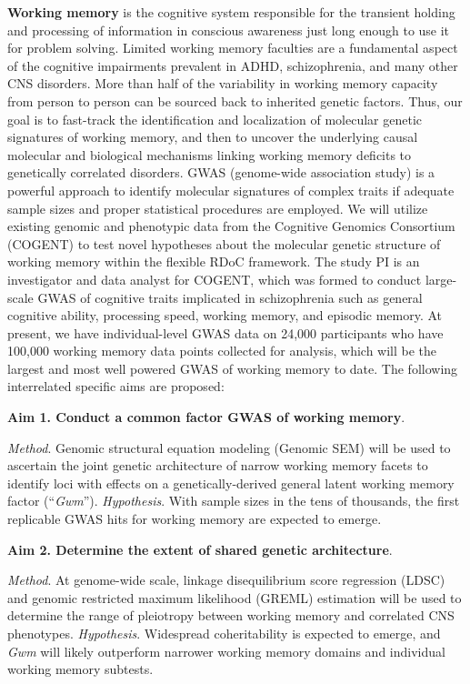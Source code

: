 \documentclass[11pt,]{article}
\begin{document}
\textbf{Working memory} is the cognitive system responsible for the transient holding and processing of information in conscious awareness just long enough to use it for problem solving.
Limited working memory faculties are a fundamental aspect of the cognitive impairments prevalent in ADHD, schizophrenia, and many other CNS disorders.
More than half of the variability in working memory capacity from person to person can be sourced back to inherited genetic factors.
Thus, our goal is to fast-track the identification and localization of molecular genetic signatures of working memory, and then to uncover the underlying causal molecular and biological mechanisms linking working memory deficits to genetically correlated disorders.
GWAS (genome-wide association study) is a powerful approach to identify molecular signatures of complex traits if adequate sample sizes and proper statistical procedures are employed.
We will utilize existing genomic and phenotypic data from the Cognitive Genomics Consortium (COGENT) to test novel hypotheses about the molecular genetic structure of working memory within the flexible RDoC framework.
The study PI is an investigator and data analyst for COGENT, which was formed to conduct large-scale GWAS of cognitive traits implicated in schizophrenia such as general cognitive ability, processing speed, working memory, and episodic memory.
At present, we have individual-level GWAS data on 24,000 participants who have 100,000 working memory data points collected for analysis, which will be the largest and most well powered GWAS of working memory to date.
The following interrelated specific aims are proposed:

\textbf{Aim 1. Conduct a common factor GWAS of working memory}.

\emph{Method}.
Genomic structural equation modeling (Genomic SEM) will be used to ascertain the joint genetic architecture of narrow working memory facets to identify loci with effects on a genetically-derived general latent working memory factor (``\emph{Gwm}'').
\emph{Hypothesis}.
With sample sizes in the tens of thousands, the first replicable GWAS hits for working memory are expected to emerge.

\textbf{Aim 2. Determine the extent of shared genetic architecture}.

\emph{Method}.
At genome-wide scale, linkage disequilibrium score regression (LDSC) and genomic restricted maximum likelihood (GREML) estimation will be used to determine the range of pleiotropy between working memory and correlated CNS phenotypes.
\emph{Hypothesis}.
Widespread coheritability is expected to emerge, and \emph{Gwm} will likely outperform narrower working memory domains and individual working memory subtests.
\end{document}
